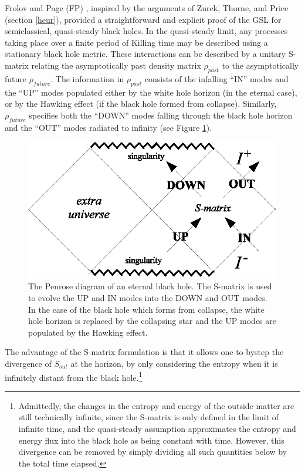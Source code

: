 \documentclass[12pt]{article}
\begin{document}
Frolov and Page (FP) \cite{FP93}, inspired by the arguments of Zurek, Thorne, and Price \cite{ZT85}\cite{TZP86} (section \ref{heur}), provided a straightforward and explicit proof of the GSL for semiclassical, quasi-steady black holes.  In the quasi-steady limit, any processes taking place over a finite period of Killing time may be described using a stationary black hole metric.  These interactions can be described by a unitary S-matrix relating the asymptotically past density matrix $\rho_{past}$ to the asymptotically future $\rho_{future}$.  The information in $\rho_{past}$ consists of the infalling ``IN'' modes and the ``UP'' modes populated either by the white hole horizon (in the eternal case), or by the Hawking effect (if the black hole formed from collapse).  Similarly, $\rho_{future}$ specifies both the ``DOWN'' modes falling through the black hole horizon and the ``OUT'' modes radiated to infinity  (see Figure \ref{eternal}).
\begin{figure}[ht]
\centering
\includegraphics{eternal.eps}
\caption{The Penrose diagram of an eternal black hole.  The S-matrix is used to evolve the UP and IN modes into the DOWN and OUT modes.  In the case of the black hole which forms from collapse, the white hole horizon is replaced by the collapsing star and the UP modes are populated by the Hawking effect.}\label{eternal}
\end{figure}
The advantage of the S-matrix formulation is that it allows one to bystep the divergence of $S_{out}$ at the horizon, by only considering the entropy when it is infinitely distant from the black hole.\footnote{Admittedly, the changes in the entropy and energy of the outside matter are still technically infinite, since the S-matrix is only defined in the limit of infinite time, and the quasi-steady assumption approximates the entropy and energy flux into the black hole as being constant with time.  However, this divergence can be removed by simply dividing all such quantities below by the total time elapsed.}
\end{document}
